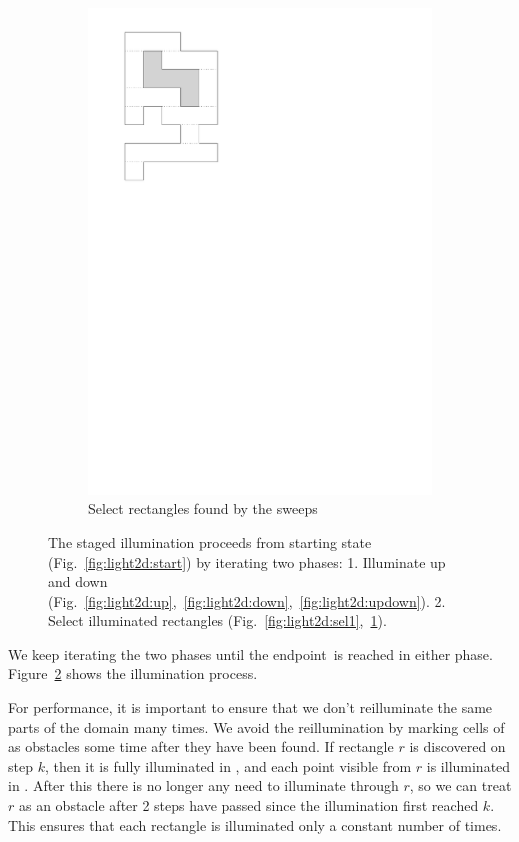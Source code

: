 \documentclass[english,gradu]{tktltiki2018}
\begin{document}
\begin{figure}
\begin{subfigure}[t]{0.15\textwidth}
		\includegraphics[width=\textwidth,page=7]{fig/light2d}
		\caption{Select rectangles found by the sweeps}\label{fig:light2d:sel2}
	\end{subfigure}
	\caption{The staged illumination proceeds from starting state (Fig.~\ref{fig:light2d:start}) by iterating two phases:
	1. Illuminate up and down (Fig.~\ref{fig:light2d:up},~\ref{fig:light2d:down},~\ref{fig:light2d:updown}).
	2. Select illuminated rectangles (Fig.~\ref{fig:light2d:sel1},~\ref{fig:light2d:sel2}).
	}\label{fig:light2d}
\end{figure}

We keep iterating the two phases until the endpoint~\ept is reached in either phase.
Figure~\ref{fig:light2d} shows the illumination process.

For performance, it is important to ensure that we don't reilluminate the same parts of the domain many times.
We avoid the reillumination by marking cells of  as obstacles some time after they have been found.
If rectangle $r$ is discovered on step $k$, then it is fully illuminated in , and each point visible from $r$ is illuminated in .
After this there is no longer any need to illuminate through $r$, so we can treat $r$ as an obstacle after 2 steps have passed since the illumination first reached $k$.
This ensures that each rectangle is illuminated only a constant number of times.
\end{document}
